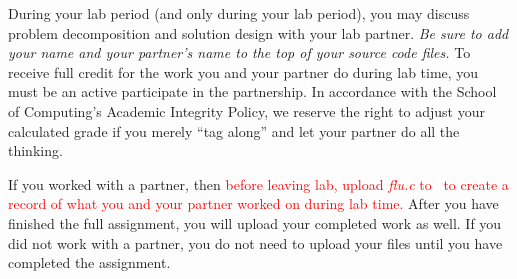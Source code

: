 During your lab period (and only during your lab period), you may discuss problem decomposition and solution design with your lab partner.
\textit{Be sure to add your name and your partner's name to the top of your source code files.}
To receive full credit for the work you and your partner do during lab time, you must be an active participate in the partnership.
In accordance with the School of Computing's Academic Integrity Policy, we reserve the right to adjust your calculated grade if you merely ``tag along'' and let your partner do all the thinking.

If you worked with a partner, then \textcolor{red}{before leaving lab, upload \textit{flu.c} to \filesubmission\ to create a record of what you and your partner worked on during lab time.}
After you have finished the full assignment, you will upload your completed work as well.
If you did not work with a partner, you do not need to upload your files until you have completed the assignment.